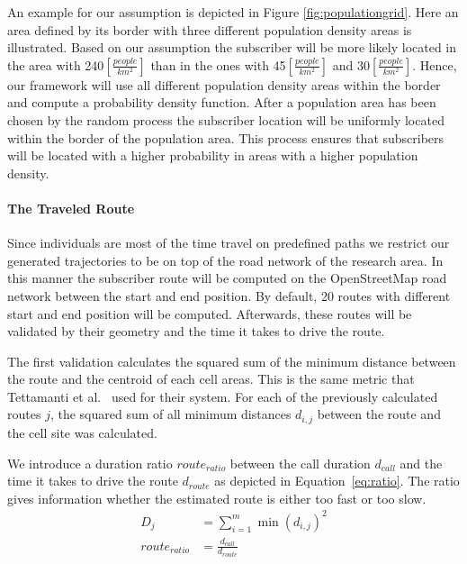 \documentclass[twocolumn]{bmcart}%
\begin{document}
An example for our assumption is depicted in Figure \ref{fig:populationgrid}. Here an area defined by its border with three different population density areas is illustrated. Based on our assumption the subscriber will be more likely located in the area with 240$[\frac{people}{km^2}]$ than in the ones with 45$[\frac{people}{km^2}]$ and 30$[\frac{people}{km^2}]$. Hence, our framework will use all different population density areas within the border and compute a probability density function. After a population area has been chosen by the random process the subscriber location will be uniformly located within the border of the population area. This process ensures that subscribers will be located with a higher probability in areas with a higher population density.
\paragraph{The Traveled Route}
Since individuals are most of the time travel on predefined paths we restrict our generated trajectories to be on top of the road network of the research area. In this manner the subscriber route will be computed on the OpenStreetMap road network between the start and end position. By default, 20 routes with different start and end position will be computed. Afterwards, these routes will be validated by their geometry and the time it takes to drive the route.

The first validation calculates the squared sum of the minimum distance between the route and the centroid of each cell areas. This is the same metric that Tettamanti et al.~\cite{Tettamanti2012} used for their system. For each of the previously calculated routes $j$, the squared sum of all minimum distances $d_{i,j}$ between the
route and the cell site was calculated.

We introduce a duration ratio $route_{ratio}$ between the call duration $d_{call}$ and the time it takes to drive the route $d_{route}$ as depicted in Equation~\ref{eq:ratio}. The ratio gives information whether the estimated route is either too fast or too slow. 
\begin{align}
	D_j           & =\sum_{i=1}^{m} \min(d_{i,j})^{2} \label{eq:sumsquaremine} \\
	route_{ratio} & =\frac{d_{call}}{d_{route}} \label{eq:ratio}               
\end{align} 
\end{document}
